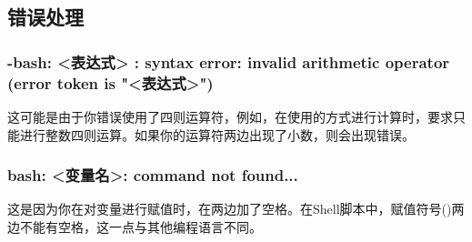 \subsection{错误处理}\label{subsec:变量-错误处理}

\subsubsection{-bash: <表达式> : syntax error: invalid arithmetic operator (error token is "<表达式>")
}

这可能是由于你错误使用了四则运算符，例如，在使用\code{\$(())}的方式进行计算时，要求只能进行整数四则运算。如果你的运算符两边出现了小数，则会出现错误。

\subsubsection{bash: <变量名>: command not found...}

这是因为你在对变量进行赋值时，在\code{=}两边加了空格。在Shell脚本中，赋值符号(\code{=})两边不能有空格，这一点与其他编程语言不同。